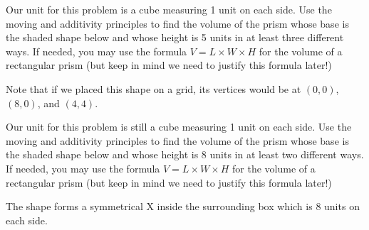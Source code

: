 \documentclass[noauthor,nooutcomes, handout]{ximera}
\begin{document}
\begin{problem}
Our unit for this problem is a cube measuring 1 unit on each side. Use the moving and additivity principles to find the volume of the prism whose base is the shaded shape below and whose height is 5 units in at least three different ways. If needed, you may use the formula $V = L \times W \times H$ for the volume of a rectangular prism (but keep in mind we need to justify this formula later!)

Note that if we placed this shape on a grid, its vertices would be at $(0,0)$, $(8,0)$, and $(4,4)$.

\begin{center}
\end{center} \vfill


\end{problem}




\begin{problem}
Our unit for this problem is still a cube measuring 1 unit on each side. Use the moving and additivity principles to find the volume of the prism whose base is the shaded shape below and whose height is 8 units in at least two different ways. If needed, you may use the formula $V = L \times W \times H$ for the volume of a rectangular prism (but keep in mind we need to justify this formula later!)

The shape forms a symmetrical X inside the surrounding box which is $8$ units on each side.

\begin{center}
\end{center} \vfill


\end{problem}

\newpage
\end{document}
